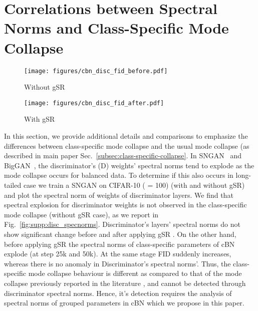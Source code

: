 \documentclass[runningheads,table]{llncs}
\begin{document}
\section{Correlations between Spectral Norms and Class-Specific Mode Collapse}
\label{sec:supp:corr}
\begin{figure*}[ht]
     \centering
     \begin{subfigure}[b]{\textwidth}
         \centering
         \texttt{[image: figures/cbn\_disc\_fid\_before.pdf]}
         \caption{Without gSR}
         \label{fig:supp:wo_gsr}
     \end{subfigure}
     \hfill
     \begin{subfigure}[b]{\textwidth}
         \centering
         \texttt{[image: figures/cbn\_disc\_fid\_after.pdf]}
         \caption{With gSR}
         \label{fig:supp:w_gsr}
     \end{subfigure}
     
    \caption{\textbf{Class-specific mode collapse exhibits unique behaviour with respect to cBN parameters.} Class-specific mode collapse leads to spectral explosion in Generator's cBN parameters' spectral norms (left), which correlates with explosion of FID (right), while having little effect on discriminator's parameters' spectral norms (middle). Class-specific mode collapse is remedied by gSR which keeps the cBN parameters' spectral norms under control.}
        \label{fig:supp:disc_specnorms}
        \vspace{-4mm}
\end{figure*}

In this section, we provide additional details and comparisons to emphasize the differences between class-specific mode collapse and the usual mode collapse (as described in main paper Sec.~\ref{subsec:class-specific-collapse}.
In SNGAN~\cite{miyato2018spectral} and  BigGAN~\cite{brock2018large}, the discriminator's (D) weights' spectral norms tend to explode as the mode collapse occurs for balanced data. To determine if this also occurs in long-tailed case we train a SNGAN on CIFAR-10 ( = 100) (with and without gSR) and plot the spectral norm of weights of discriminator layers. We find that spectral explosion for discriminator weights is not observed in the class-specific mode collapse (without gSR case), as we report in Fig.~\ref{fig:supp:disc_specnorms}. Discriminator's layers' spectral norms do not show significant change before and after applying gSR . On the other hand, before applying gSR the spectral norms of class-specific parameters of cBN explode (at step 25k and 50k). At the same stage FID suddenly increases, whereas there is no anomaly in Discriminator's spectral norms'.  Thus, the class-specific mode collapse behaviour is different as compared to that of the mode collapse previously reported in the literature \cite{miyato2018cgans, brock2018large}, and cannot be detected through discriminator spectral norms. Hence, it's detection requires the analysis of spectral norms of grouped parameters in cBN  which we propose in this paper. 
 
\end{document}
